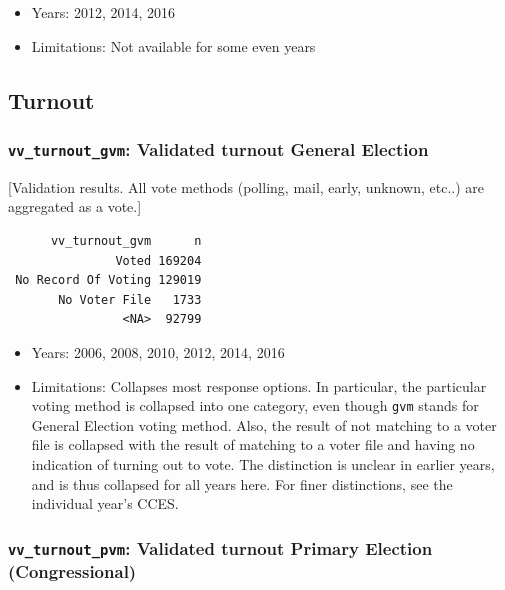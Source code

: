 \documentclass[10pt,article,oneside]{memoir}
\theoremstyle{definition}
\begin{document}
\begin{itemize}
\tightlist
\item
  Years: 2012, 2014, 2016
\item
  Limitations: Not available for some even years
\end{itemize}

\hypertarget{turnout}{%
\subsection{Turnout}\label{turnout}}

\hypertarget{vv_turnout_gvm-validated-turnout-general-election}{%
\subsubsection{\texorpdfstring{\texttt{vv\_turnout\_gvm}: Validated
turnout General
Election}{vv\_turnout\_gvm: Validated turnout General Election}}\label{vv_turnout_gvm-validated-turnout-general-election}}

{[}Validation results. All vote methods (polling, mail, early, unknown,
etc..) are aggregated as a vote.{]}

\begin{verbatim}
      vv_turnout_gvm      n
               Voted 169204
 No Record Of Voting 129019
       No Voter File   1733
                <NA>  92799
\end{verbatim}

\begin{itemize}
\tightlist
\item
  Years: 2006, 2008, 2010, 2012, 2014, 2016
\item
  Limitations: Collapses most response options. In particular, the
  particular voting method is collapsed into one category, even though
  \texttt{gvm} stands for General Election voting method. Also, the
  result of not matching to a voter file is collapsed with the result of
  matching to a voter file and having no indication of turning out to
  vote. The distinction is unclear in earlier years, and is thus
  collapsed for all years here. For finer distinctions, see the
  individual year's CCES.
\end{itemize}

\hypertarget{vv_turnout_pvm-validated-turnout-primary-election-congressional}{%
\subsubsection{\texorpdfstring{\texttt{vv\_turnout\_pvm}: Validated
turnout Primary Election
(Congressional)}{vv\_turnout\_pvm: Validated turnout Primary Election (Congressional)}}\label{vv_turnout_pvm-validated-turnout-primary-election-congressional}}
\end{document}
